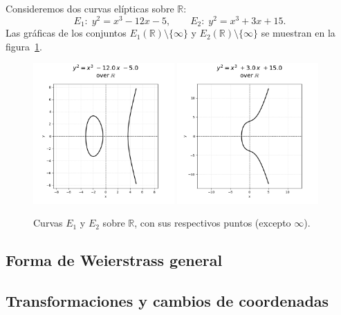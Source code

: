 \begin{ejemplo}
Consideremos dos curvas elípticas sobre \(\mathbb{R}\):
\[
  E_1: \;y^2 = x^3 - 12x - 5,
  \qquad
  E_2: \;y^2 = x^3 + 3x + 15.
\]
Las gráficas de los conjuntos \(E_1(\mathbb{R})\setminus\{\infty\}\) y
\(E_2(\mathbb{R})\setminus\{\infty\}\) se muestran en la figura~\ref{fig:curvas_reales}.
\end{ejemplo}

\begin{figure}[H]
  \centering
  \includegraphics[width=0.48\textwidth]{imagenes/elliptic_curve2D_example.png}
  \hfill
  \includegraphics[width=0.48\textwidth]{imagenes/elliptic_curve2D_example2.png}
  \caption{Curvas \(E_1\) y \(E_2\) sobre \(\mathbb{R}\), con sus respectivos puntos (excepto \(\infty\)).}
  \label{fig:curvas_reales}
\end{figure}

\subsection{Forma de Weierstrass general}\label{sec:weierstrass_curvas_elipticas}
\subsection{Transformaciones y cambios de coordenadas}

